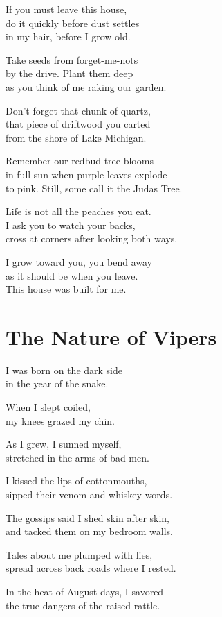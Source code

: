 \documentclass[twoside,10pt]{book}
\begin{document}
If you must leave this house,\\
do it quickly before dust settles\\
in my hair, before I grow old.

Take seeds from forget-me-nots\\
by the drive. Plant them deep\\
as you think of me raking our garden.

Don't forget that chunk of quartz,\\
that piece of driftwood you carted\\
from the shore of Lake Michigan.

Remember our redbud tree blooms\\
in full sun when purple leaves explode\\
to pink. Still, some call it the Judas Tree.

Life is not all the peaches you eat.\\
I ask you to watch your backs,\\
cross at corners after looking both ways.

I grow toward you, you bend away\\
as it should be when you leave.\\
This house was built for me.


\clearpage
\section{The Nature of Vipers}

I was born on the dark side\\
in the year of the snake.

When I slept coiled,\\
my knees grazed my chin.

As I grew, I sunned myself,\\
stretched in the arms of bad men.

I kissed the lips of cottonmouths,\\
sipped their venom and whiskey words.

The gossips said I shed skin after skin,\\
and tacked them on my bedroom walls.

Tales about me plumped with lies,\\
spread across back roads where I rested.

In the heat of August days, I savored\\
the true dangers of the raised rattle.
\end{document}
